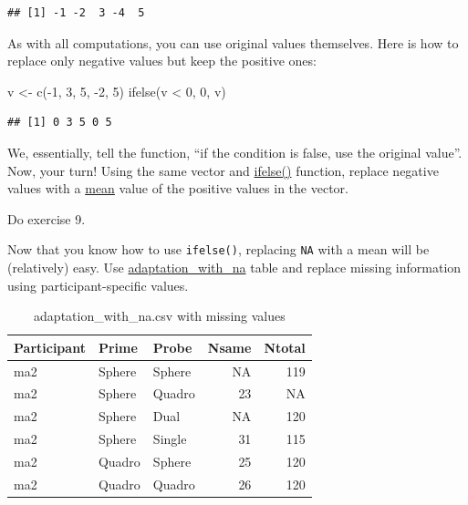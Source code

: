 \documentclass[
]{book}
\newenvironment{Shaded}{\begin{snugshade}}{\end{snugshade}}
\newcommand{\DecValTok}[1]{\textcolor[rgb]{0.00,0.00,0.81}{#1}}
\newcommand{\FunctionTok}[1]{\textcolor[rgb]{0.00,0.00,0.00}{#1}}
\newcommand{\NormalTok}[1]{#1}
\newcommand{\OtherTok}[1]{\textcolor[rgb]{0.56,0.35,0.01}{#1}}
\newcommand{\SpecialCharTok}[1]{\textcolor[rgb]{0.00,0.00,0.00}{#1}}
\begin{document}
\begin{verbatim}
## [1] -1 -2  3 -4  5
\end{verbatim}

As with all computations, you can use original values themselves. Here is how to replace only negative values but keep the positive ones:

\begin{Shaded}
\begin{Highlighting}[]
\NormalTok{v }\OtherTok{\textless{}{-}} \FunctionTok{c}\NormalTok{(}\SpecialCharTok{{-}}\DecValTok{1}\NormalTok{, }\DecValTok{3}\NormalTok{, }\DecValTok{5}\NormalTok{, }\SpecialCharTok{{-}}\DecValTok{2}\NormalTok{, }\DecValTok{5}\NormalTok{)}
\FunctionTok{ifelse}\NormalTok{(v }\SpecialCharTok{\textless{}} \DecValTok{0}\NormalTok{, }\DecValTok{0}\NormalTok{, v)}
\end{Highlighting}
\end{Shaded}

\begin{verbatim}
## [1] 0 3 5 0 5
\end{verbatim}

We, essentially, tell the function, ``if the condition is false, use the original value''. Now, your turn! Using the same vector and \href{https://stat.ethz.ch/R-manual/R-devel/library/base/html/ifelse.html}{ifelse()} function, replace negative values with a \href{https://stat.ethz.ch/R-manual/R-devel/library/base/html/mean.html}{mean} value of the positive values in the vector.

Do exercise 9.

Now that you know how to use \texttt{ifelse()}, replacing \texttt{NA} with a mean will be (relatively) easy. Use \href{data/adaptation_with_na.csv}{adaptation\_with\_na} table and replace missing information using participant-specific values.

\begin{table}

\caption{\label{tab:unnamed-chunk-291}adaptation\_with\_na.csv with missing values}
\centering
\begin{tabular}[t]{l|l|l|r|r}
\hline
Participant & Prime & Probe & Nsame & Ntotal\\
\hline
ma2 & Sphere & Sphere & NA & 119\\
\hline
ma2 & Sphere & Quadro & 23 & NA\\
\hline
ma2 & Sphere & Dual & NA & 120\\
\hline
ma2 & Sphere & Single & 31 & 115\\
\hline
ma2 & Quadro & Sphere & 25 & 120\\
\hline
ma2 & Quadro & Quadro & 26 & 120\\
\hline
\end{tabular}
\end{table}
\end{document}
